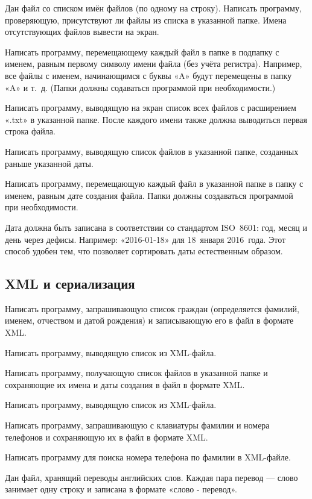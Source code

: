 \task Дан файл со списком имён файлов (по одному на строку). Написать
программу, проверяющую, присутствуют ли файлы из списка в указанной
папке. Имена отсутствующих файлов вывести на экран.

\task Написать программу, перемещающему каждый файл в папке в подпапку
с именем, равным первому символу имени файла (без учёта
регистра). Например, все файлы с именем, начинающимся с буквы «A»
будут перемещены в папку «A» и т.~д. (Папки должны содаваться
программой при необходимости.)

\task Написать программу, выводящую на экран список всех файлов с
расширением «.txt» в указанной папке. После каждого имени также должна
выводиться первая строка файла.

\task Написать программу, выводящую список файлов в указанной папке,
созданных раньше указанной даты.

\task Написать программу, перемещающую каждый файл в указанной папке в
папку с именем, равным дате создания файла. Папки должны создаваться
программой при необходимости.

Дата должна быть записана в соответствии со стандартом ISO~8601: год,
месяц и день через дефисы. Например: «2016-01-18» для 18~января
2016~года. Этот способ удобен тем, что позволяет сортировать даты
естественным образом.


\subsection{XML и сериализация}

\task Написать программу, запрашивающую список граждан (определяется
фамилий, именем, отчеством и датой рождения) и записывающую его в
файл в формате XML.

Написать программу, выводящую список из XML-файла.

\task Написать программу, получающую список файлов в указанной папке и
сохраняющие их имена и даты создания в файл в формате XML.

Написать программу, выводящую список из XML-файла.

\task Написать программу, запрашивающую с клавиатуры фамилии и номера
телефонов и сохраняющую их в файл в формате XML.

Написать программу для поиска номера телефона по фамилии в XML-файле.

\task Дан файл, хранящий переводы английских слов. Каждая пара перевод
— слово занимает одну строку и записана в формате «слово - перевод».

